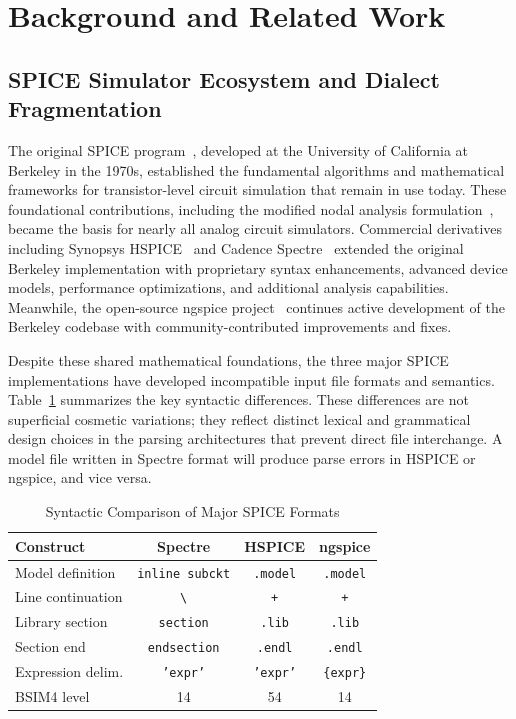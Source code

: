 \documentclass[10pt,twocolumn]{article}
\begin{document}
\section{Background and Related Work}
\label{sec:background}

\subsection{SPICE Simulator Ecosystem and Dialect Fragmentation}

The original SPICE program~\cite{spice70}, developed at the University of California at Berkeley in the 1970s, established the fundamental algorithms and mathematical frameworks for transistor-level circuit simulation that remain in use today. These foundational contributions, including the modified nodal analysis formulation~\cite{mna_analysis}, became the basis for nearly all analog circuit simulators. Commercial derivatives including Synopsys HSPICE~\cite{hspice, hspice2} and Cadence Spectre~\cite{spectre} extended the original Berkeley implementation with proprietary syntax enhancements, advanced device models, performance optimizations, and additional analysis capabilities. Meanwhile, the open-source ngspice project~\cite{ngspice} continues active development of the Berkeley codebase with community-contributed improvements and fixes.

Despite these shared mathematical foundations, the three major SPICE implementations have developed incompatible input file formats and semantics. Table~\ref{tab:simulators} summarizes the key syntactic differences. These differences are not superficial cosmetic variations; they reflect distinct lexical and grammatical design choices in the parsing architectures that prevent direct file interchange. A model file written in Spectre format will produce parse errors in HSPICE or ngspice, and vice versa.

\begin{table}[!t]
\caption{Syntactic Comparison of Major SPICE Formats}
\label{tab:simulators}
\centering
\renewcommand{\arraystretch}{1.15}
\begin{tabular}{@{}lccc@{}}
\toprule
\textbf{Construct} & \textbf{Spectre} & \textbf{HSPICE} & \textbf{ngspice} \\
\midrule
Model definition & \texttt{inline subckt} & \texttt{.model} & \texttt{.model} \\
Line continuation & \texttt{\textbackslash} & \texttt{+} & \texttt{+} \\
Library section & \texttt{section} & \texttt{.lib} & \texttt{.lib} \\
Section end & \texttt{endsection} & \texttt{.endl} & \texttt{.endl} \\
Expression delim. & \texttt{'expr'} & \texttt{'expr'} & \texttt{\{expr\}} \\
BSIM4 level & 14 & 54 & 14 \\
\bottomrule
\end{tabular}
\end{table}
\end{document}
